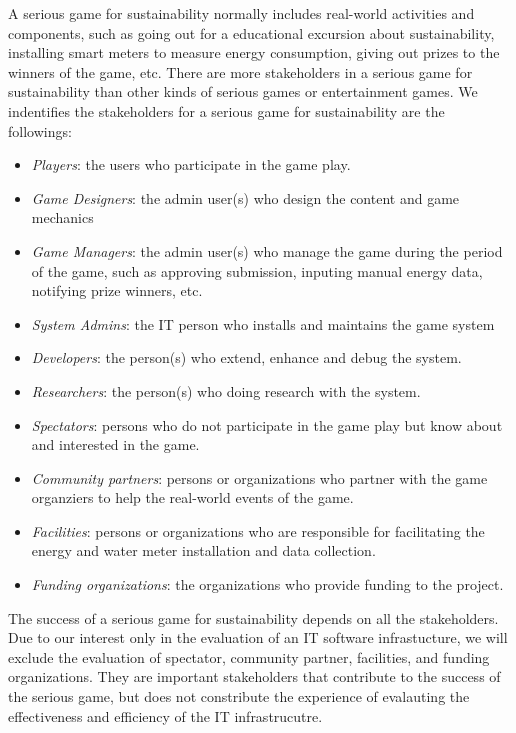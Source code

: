 A serious game for sustainability normally includes real-world activities and components, such as going out for a educational excursion about sustainability, installing smart meters to measure energy consumption, giving out prizes to the winners of the game, etc. There are more stakeholders in a serious game for sustainability than other kinds of serious games or entertainment games. We indentifies the stakeholders for a serious game for sustainability are the followings:

\begin{itemize}
\item \emph{Players}: the users who participate in the game play.
\item \emph{Game Designers}: the admin user(s) who design the content and game mechanics
 \item \emph{Game Managers}: the admin user(s) who manage the game during the period of the game, such as approving submission, inputing manual energy data, notifying prize winners, etc.
\item \emph{System Admins}: the IT person who installs and maintains the game system
\item \emph{Developers}: the person(s) who extend, enhance and debug the system.
\item \emph{Researchers}: the person(s) who doing research with the system.
\item \emph{Spectators}: persons who do not participate in the game play but know about and interested in the game.
\item \emph{Community partners}: persons or organizations who partner with the game organziers to help the real-world events of the game.
\item \emph{Facilities}: persons or organizations who are responsible for facilitating the energy and water meter installation and data collection.
\item \emph{Funding organizations}: the organizations who provide funding to the project.
\end{itemize}

The success of a serious game for sustainability depends on all the stakeholders. Due to our interest only in the evaluation of an IT software infrastucture, we will exclude the evaluation of spectator, community partner, facilities, and funding organizations. They are important stakeholders that contribute to the success of the serious game, but does not constribute the experience of evalauting the effectiveness and efficiency of the IT infrastrucutre.

